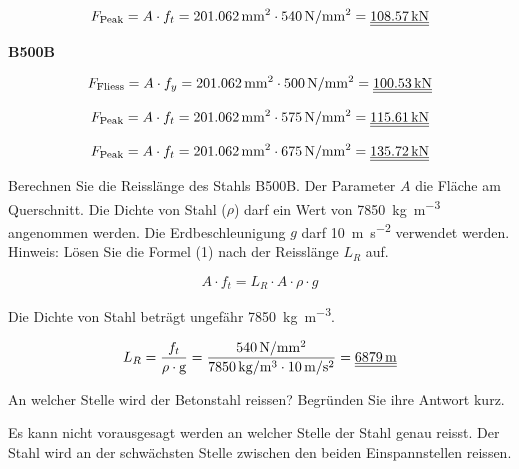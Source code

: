 \begin{questions}
\begin{solution}
        \begin{equation*}
            F_{\text{Peak}} = A \cdot f_t = \SI{201.062}{\mm^2} \cdot \myNmm{540} = \FinRes{\SI{108.57}{\kilo\N}}
        \end{equation*}

        \textbf{B500B}

        \begin{equation*}
            F_{\text{Fliess}} = A \cdot f_y = \SI{201.062}{\mm^2} \cdot \myNmm{500} = \FinRes{\SI{100.53}{\kilo\N}}
        \end{equation*}

        \begin{equation*}
            F_{\text{Peak}} = A \cdot f_t = \SI{201.062}{\mm^2} \cdot \myNmm{575} = \FinRes{\SI{115.61}{\kilo\N}}
        \end{equation*}

        \begin{equation*}
            F_{\text{Peak}} = A \cdot f_t = \SI{201.062}{\mm^2} \cdot \myNmm{675} = \FinRes{\SI{135.72}{\kilo\N}}
        \end{equation*}
    \end{solution}

    \question
    Berechnen Sie die Reisslänge des Stahls B500B.
    Der Parameter $A$ die Fläche am Querschnitt.
    Die Dichte von Stahl ($\rho$) darf ein Wert von \SI{7850}{\kg\per \m^3} angenommen werden.
    Die Erdbeschleunigung $g$ darf \SI{10}{\m\per\s^2} verwendet werden.
    Hinweis: Lösen Sie die Formel (1) nach der Reisslänge $L_R$ auf.

    \begin{equation}
        A \cdot f_t = L_R \cdot A \cdot \rho \cdot g
    \end{equation}

    \begin{solution}
        Die Dichte von Stahl beträgt ungefähr \SI{7850}{\kg\per\m^3}.


        \begin{equation*}
            L_R =  \dfrac{f_t}{\rho \cdot \text{g}} = \dfrac{\myNmm{540}}{\SI{7850}{\kg\per\m^3} \cdot \SI{10}{\m\per\s^2}} = \FinRes{\SI{6879}{\m}}
        \end{equation*}
    \end{solution}


    \question
    An welcher Stelle wird der Betonstahl reissen? Begründen Sie ihre Antwort kurz.

    \begin{solution}
        Es kann nicht vorausgesagt werden an welcher Stelle der Stahl genau reisst.
        Der Stahl wird an der schwächsten Stelle zwischen den beiden Einspannstellen reissen.
    \end{solution}


\end{questions}
